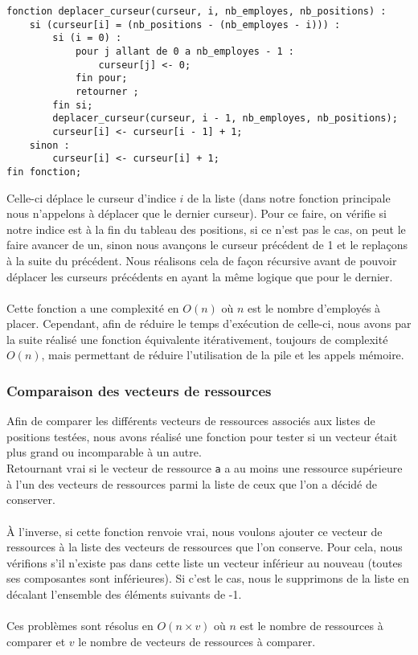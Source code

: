 \begin{lstlisting}[style=customstyle]
fonction deplacer_curseur(curseur, i, nb_employes, nb_positions) :
    si (curseur[i] = (nb_positions - (nb_employes - i))) :
        si (i = 0) :
            pour j allant de 0 a nb_employes - 1 :
                curseur[j] <- 0;
            fin pour;
            retourner ; 
        fin si;
        deplacer_curseur(curseur, i - 1, nb_employes, nb_positions);  
        curseur[i] <- curseur[i - 1] + 1; 
    sinon :
        curseur[i] <- curseur[i] + 1;
fin fonction;

\end{lstlisting}
\label{lst:deplacer_curseur}
\vspace{1cm}
Celle-ci déplace le curseur d'indice \(i\) de la liste (dans notre fonction principale nous n'appelons à déplacer que le dernier curseur).
Pour ce faire, on vérifie si notre indice est à la fin du tableau des positions, si ce n'est pas le cas, on peut le faire avancer de un, sinon nous avançons le curseur précédent de 1 et le replaçons à la suite du précédent. Nous réalisons cela de façon récursive avant de pouvoir déplacer les curseurs précédents en ayant la même logique que pour le dernier.\\ \\
Cette fonction a une complexité en \(O(n)\) où \(n\) est le nombre d'employés à placer.
Cependant, afin de réduire le temps d'exécution de celle-ci, nous avons par la suite réalisé une fonction équivalente itérativement, toujours de complexité \(O(n)\), mais permettant de réduire l'utilisation de la pile et les appels mémoire.

\subsubsection{Comparaison des vecteurs de ressources}
Afin de comparer les différents vecteurs de ressources associés aux listes de positions testées, nous avons réalisé une fonction pour tester si un vecteur était plus grand ou incomparable à un autre.\\
Retournant vrai si le vecteur de ressource \texttt{a} a au moins une ressource supérieure à l'un des vecteurs de ressources parmi la liste de ceux que l'on a décidé de conserver.\\ \\
À l'inverse, si cette fonction renvoie vrai, nous voulons ajouter ce vecteur de ressources à la liste des vecteurs de ressources que l'on conserve. Pour cela, nous vérifions s'il n'existe pas dans cette liste un vecteur inférieur au nouveau (toutes ses composantes sont inférieures). Si c'est le cas, nous le supprimons de la liste en décalant l'ensemble des éléments suivants de -1.\\ \\
Ces problèmes sont résolus en \(O(n \times v)\) où \(n\) est le nombre de ressources à comparer et \(v\) le nombre de vecteurs de ressources à comparer.

